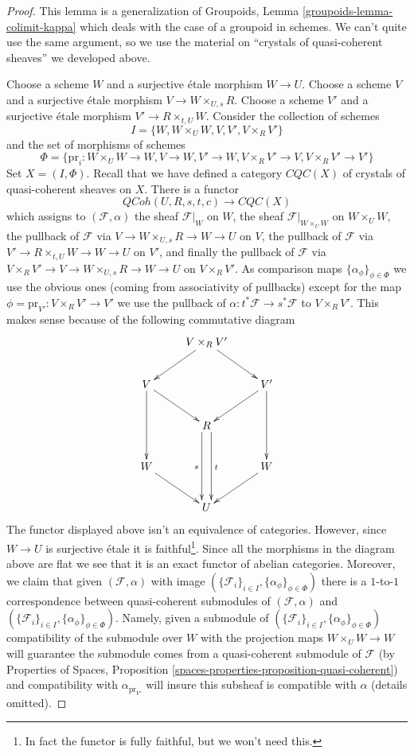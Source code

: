 \documentclass{stacks-project}
\theoremstyle{plain}
\theoremstyle{definition}
\theoremstyle{remark}
\numberwithin{equation}{subsection}
\def\QCoh{\mathit{QCoh}}
\begin{document}
\begin{proof}
This lemma is a generalization of
Groupoids, Lemma \ref{groupoids-lemma-colimit-kappa}
which deals with the case of a groupoid in schemes.
We can't quite use the same argument, so we use the
material on ``crystals of quasi-coherent sheaves'' we developed above.

\medskip\noindent
Choose a scheme $W$ and a surjective \'etale morphism $W \to U$.
Choose a scheme $V$ and a surjective \'etale morphism
$V \to W \times_{U, s} R$. Choose a scheme $V'$
and a surjective \'etale morphism $V' \to R \times_{t, U} W$.
Consider the collection of schemes
$$
I = \{W, W \times_U W, V, V', V \times_R V'\}
$$
and the set of morphisms of schemes
$$
\Phi = \{\text{pr}_i : W \times_U W \to W, V \to W, V' \to W,
V \times_R V' \to V, V \times_R V' \to V'\}
$$
Set $X = (I, \Phi)$. Recall that we have defined a category $\textit{CQC}(X)$
of crystals of quasi-coherent sheaves on $X$. There is a functor
$$
\QCoh(U, R, s, t, c) \longrightarrow \textit{CQC}(X)
$$
which assigns to $(\mathcal{F}, \alpha)$ the sheaf $\mathcal{F}|_W$ on $W$,
the sheaf $\mathcal{F}|_{W \times_U W}$ on $W \times_U W$, the
pullback of $\mathcal{F}$ via $V \to W \times_{U, s} R \to W \to U$
on $V$, the pullback of $\mathcal{F}$ via
$V' \to R \times_{t, U} W \to W \to U$ on $V'$, and finally the
pullback of $\mathcal{F}$ via
$V \times_R V' \to V \to W \times_{U, s} R \to W \to U$ on $V \times_R V'$.
As comparison maps $\{\alpha_\phi\}_{\phi \in \Phi}$
we use the obvious ones (coming from associativity of pullbacks)
except for the map
$\phi = \text{pr}_{V'} : V \times_R V' \to V'$ we use the pullback
of $\alpha : t^*\mathcal{F} \to s^*\mathcal{F}$ to $V \times_R V'$.
This makes sense because of the following commutative diagram
$$
\xymatrix{
& V \times_R V' \ar[ld] \ar[rd] \\
V \ar[rd] \ar[dd] & & V' \ar[ld] \ar[dd] \\
& R \ar@<-1ex>[dd]_s \ar@<1ex>[dd]^t \\
W \ar[rd] & & W \ar[ld] \\
& U
}
$$
The functor displayed above isn't an equivalence of categories.
However, since $W \to U$ is surjective \'etale it is faithful\footnote{In
fact the functor is fully faithful, but we won't need this.}.
Since all the morphisms in the diagram above are flat we see that
it is an exact functor of abelian categories. Moreover, we
claim that given $(\mathcal{F}, \alpha)$ with image
$(\{\mathcal{F}_i\}_{i \in I}, \{\alpha_\phi\}_{\phi \in \Phi})$
there is a $1$-to-$1$ correspondence between quasi-coherent submodules
of $(\mathcal{F}, \alpha)$ and
$(\{\mathcal{F}_i\}_{i \in I}, \{\alpha_\phi\}_{\phi \in \Phi})$.
Namely, given a submodule of
$(\{\mathcal{F}_i\}_{i \in I}, \{\alpha_\phi\}_{\phi \in \Phi})$
compatibility of the submodule over $W$ with the projection maps
$W \times_U W \to W$ will guarantee the submodule comes from a
quasi-coherent submodule of $\mathcal{F}$ (by
Properties of Spaces, Proposition
\ref{spaces-properties-proposition-quasi-coherent})
and compatibility with $\alpha_{\text{pr}_{V'}}$ will insure this
subsheaf is compatible with $\alpha$ (details omitted).


\end{proof}
\end{document}

